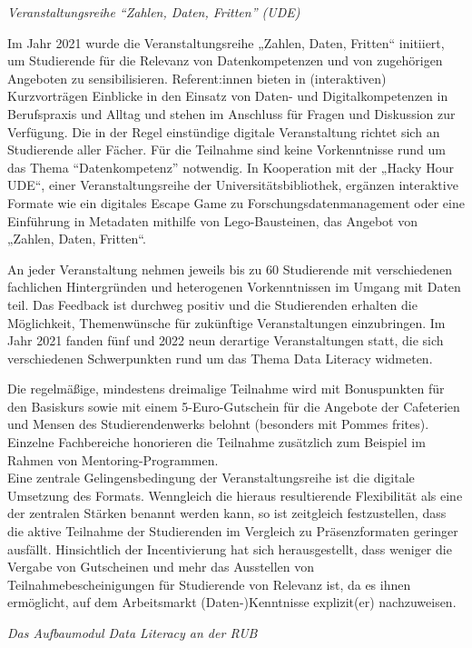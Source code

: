 \documentclass[
  letterpaper,
  DIV=11]{scrartcl}
\begin{document}
\emph{Veranstaltungsreihe ``Zahlen, Daten, Fritten'' (UDE)}

Im Jahr 2021 wurde die Veranstaltungsreihe „Zahlen, Daten, Fritten``
initiiert, um Studierende für die Relevanz von Datenkompetenzen und von
zugehörigen Angeboten zu sensibilisieren. Referent:innen bieten in
(interaktiven) Kurzvorträgen Einblicke in den Einsatz von Daten- und
Digitalkompetenzen in Berufspraxis und Alltag und stehen im Anschluss
für Fragen und Diskussion zur Verfügung. Die in der Regel einstündige
digitale Veranstaltung richtet sich an Studierende aller Fächer. Für die
Teilnahme sind keine Vorkenntnisse rund um das Thema ``Datenkompetenz''
notwendig. In Kooperation mit der „Hacky Hour UDE``, einer
Veranstaltungsreihe der Universitätsbibliothek, ergänzen interaktive
Formate wie ein digitales Escape Game zu Forschungsdatenmanagement oder
eine Einführung in Metadaten mithilfe von Lego-Bausteinen, das Angebot
von „Zahlen, Daten, Fritten``.

An jeder Veranstaltung nehmen jeweils bis zu 60 Studierende mit
verschiedenen fachlichen Hintergründen und heterogenen Vorkenntnissen im
Umgang mit Daten teil. Das Feedback ist durchweg positiv und die
Studierenden erhalten die Möglichkeit, Themenwünsche für zukünftige
Veranstaltungen einzubringen. Im Jahr 2021 fanden fünf und 2022 neun
derartige Veranstaltungen statt, die sich verschiedenen Schwerpunkten
rund um das Thema Data Literacy widmeten.

Die regelmäßige, mindestens dreimalige Teilnahme wird mit Bonuspunkten
für den Basiskurs sowie mit einem 5-Euro-Gutschein für die Angebote der
Cafeterien und Mensen des Studierendenwerks belohnt (besonders mit
Pommes frites). Einzelne Fachbereiche honorieren die Teilnahme
zusätzlich zum Beispiel im Rahmen von Mentoring-Programmen.\\
Eine zentrale Gelingensbedingung der Veranstaltungsreihe ist die
digitale Umsetzung des Formats. Wenngleich die hieraus resultierende
Flexibilität als eine der zentralen Stärken benannt werden kann, so ist
zeitgleich festzustellen, dass die aktive Teilnahme der Studierenden im
Vergleich zu Präsenzformaten geringer ausfällt. Hinsichtlich der
Incentivierung hat sich herausgestellt, dass weniger die Vergabe von
Gutscheinen und mehr das Ausstellen von Teilnahmebescheinigungen für
Studierende von Relevanz ist, da es ihnen ermöglicht, auf dem
Arbeitsmarkt (Daten-)Kenntnisse explizit(er) nachzuweisen.

\emph{Das Aufbaumodul Data Literacy an der RUB}
\end{document}
